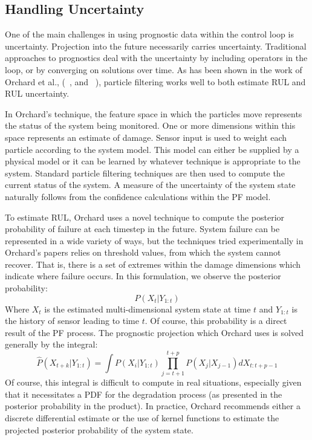 \documentclass[12pt]{article}
\begin{document}
\subsection{Handling Uncertainty}
One of the main challenges in using prognostic data within the control
loop is uncertainty.  Projection into the future necessarily carries
uncertainty.  Traditional approaches to prognostics deal with the
uncertainty by including operators in the loop, or by converging on
solutions over time. As has been shown in the work of Orchard et al.,
(~\cite{orchard2005}, and ~\cite{4711433}), particle filtering works
well to both estimate RUL and RUL uncertainty.

In Orchard's technique, the feature space in which the particles move
represents the status of the system being monitored.  One or more
dimensions within this space represents an estimate of damage.  Sensor
input is used to weight each particle according to the system model.
This model can either be supplied by a physical model or it can be
learned by whatever technique is appropriate to the system.  Standard
particle filtering techniques are then used to compute the current
status of the system. A measure of the uncertainty of the system state
naturally follows from the confidence calculations within the PF
model.

To estimate RUL, Orchard uses a novel technique to compute the
posterior probability of failure at each timestep in the future.
System failure can be represented in a wide variety of ways, but the
techniques tried experimentally in Orchard's papers relies on
threshold values, from which the system cannot recover.  That is,
there is a set of extremes within the damage dimensions which indicate
where failure occurs. In this formulation, we observe the posterior
probability: 
\[
P(X_t | Y_{1:t})
\]
Where $X_t$ is the estimated multi-dimensional system state at time
$t$ and $Y_{1:t}$ is the history of sensor leading to time $t$.
Of course, this probability is a direct result of the PF process.  The
prognostic projection which Orchard uses is solved generally by the
integral:
\[
  \hat{P}(X_{t+k} | Y_{1:t}) = \int P(X_i | Y_{1:t}) 
  \displaystyle\prod_{j=t+1}^{t+p} P(X_j | X_{j-1})dX_{t:t+p-1}
\]
Of course, this integral is difficult to compute in real situations,
especially given that it necessitates a PDF for the degradation
process (as presented in the posterior probability in the product).
In practice, Orchard recommends either a discrete differential
estimate or the use of kernel functions to estimate the projected
posterior probability of the system state.
\end{document}
